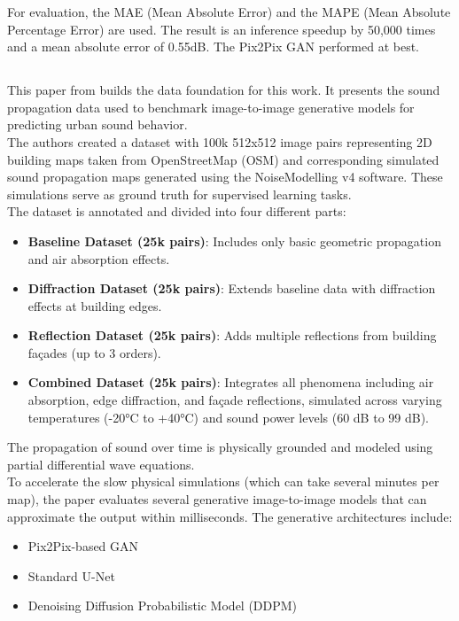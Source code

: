 			For evaluation, the MAE (Mean Absolute Error) and the MAPE (Mean Absolute Percentage Error) are used. The result is an inference speedup by 50{,}000 times and a mean absolute error of 0.55dB. The Pix2Pix GAN performed at best.
		
		\subsection{}
			This paper from \citeauthor{spitznagel_urban_2024-1} builds the data foundation for this work. It presents the sound propagation data used to benchmark image-to-image generative models for predicting urban sound behavior.\\
			The authors created a dataset with 100k 512x512 image pairs representing 2D building maps taken from OpenStreetMap (OSM) and corresponding simulated sound propagation maps generated using the NoiseModelling v4 software. These simulations serve as ground truth for supervised learning tasks.\\
			The dataset is annotated and divided into four different parts:
			\begin{itemize}[itemsep=1mm, parsep=0pt]
				\item \textbf{Baseline Dataset (25k pairs)}: Includes only basic geometric propagation and air absorption effects.
				\item \textbf{Diffraction Dataset (25k pairs)}: Extends baseline data with diffraction effects at building edges.
				\item \textbf{Reflection Dataset (25k pairs)}: Adds multiple reflections from building façades (up to 3 orders).
				\item \textbf{Combined Dataset (25k pairs)}: Integrates all phenomena including air absorption, edge diffraction, and façade reflections, simulated across varying temperatures (-20°C to +40°C) and sound power levels (60 dB to 99 dB).
			\end{itemize}
			The propagation of sound over time is physically grounded and modeled using partial differential wave equations.\\
			To accelerate the slow physical simulations (which can take several minutes per map), the paper evaluates several generative image-to-image models that can approximate the output within milliseconds. The generative architectures include:
			\begin{itemize}[itemsep=1mm, parsep=0pt]
				\item Pix2Pix-based GAN
				\item Standard U-Net
				\item Denoising Diffusion Probabilistic Model (DDPM)
			\end{itemize}
